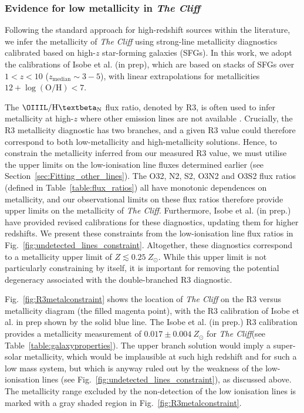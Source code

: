 \documentclass[fleqn,usenatbib]{mnras}
\newcommand{\Hbeta}{\text{H\textbeta}\xspace}
\newcommand{\cliff}{\textit{The Cliff}\xspace}
\begin{document}
\subsubsection{Evidence for low metallicity in \cliff}\label{sec:Evidence_for_low_metal}

Following the standard approach for high-redshift sources within the literature, we infer the metallicity of \cliff using strong-line metallicity diagnostics calibrated based on high-$z$ star-forming galaxies (SFGs). 
In this work, we adopt the calibrations of Isobe et al. (in prep), which are based on stacks of SFGs over $1<z<10$ ($z_\mathrm{median} \sim 3-5$), with linear extrapolations for metallicities $12 + \log(\mathrm{O/H}) < 7$. 

The $\OIIIL/\Hbeta_\mathrm{N}$ flux ratio, denoted by R3, is often used to infer metallicity at high-$z$ where other emission lines are not available \citep[e.g.][]{Curti2020, Sanders2025}. 
Crucially, the R3 metallicity diagnostic has two branches, and a given R3 value could therefore correspond to both low-metallicity and high-metallicity solutions. 
Hence, to constrain the metallicity inferred from our measured R3 value, we must utilise the upper limits on the low-ionisation line fluxes determined earlier (see Section~\ref{sec:Fitting_other_lines}). 
The O32, N2, S2, O3N2 and O3S2 flux ratios (defined in Table~\ref{table:flux_ratios}) all have monotonic dependences on metallicity, and our observational limits on these flux ratios therefore provide upper limits on the metallicity of \cliff. 
Furthermore, Isobe et al. (in prep.) have provided revised calibrations for these diagnostics, updating them for higher redshifts. 
We present these constraints from the low-ionisation line flux ratios in Fig.~\ref{fig:undetected_lines_constraint}. 
Altogether, these diagnostics correspond to a metallicity upper limit of $Z\lesssim 0.25 \ Z_\odot$. 
While this upper limit is not particularly constraining by itself, it is important for removing the potential degeneracy associated with the double-branched R3 diagnostic.


Fig.~\ref{fig:R3metalconstraint} shows the location of \cliff on the R3 versus metallicity diagram (the filled magenta point), with the R3 calibration of Isobe et al. in prep shown by the solid blue line. 
The Isobe et al. (in prep.) R3 calibration provides a metallicity measurement of $0.017\pm0.004 \ Z_\odot$ for \cliff (see Table~\ref{table:galaxyproperties}). 
The upper branch solution would imply a super-solar metallicity, which would be implausible at such high redshift and for such a low mass system, but which is anyway ruled out by the weakness of the low-ionisation lines (see Fig.~\ref{fig:undetected_lines_constraint}), as discussed above. The metallicity range excluded by the non-detection of the low ionisation lines is marked with a gray shaded region in Fig.~\ref{fig:R3metalconstraint}.
\end{document}
